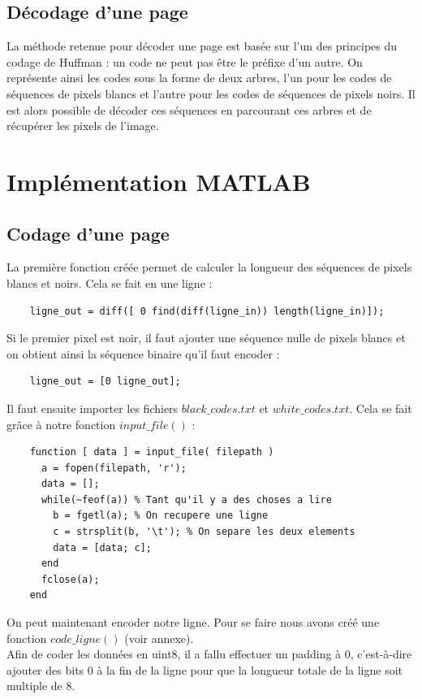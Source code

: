 \documentclass[11pt]{article}
\begin{document}
  \subsection{Décodage d'une page}
  
  La méthode retenue pour décoder une page est basée sur l'un des principes du codage de Huffman : un code ne peut pas être le préfixe d'un autre. On représente ainsi les codes sous la forme de deux arbres, l'un pour les codes de séquences de pixels blancs et l'autre pour les codes de séquences de pixels noirs. Il est alors possible de décoder ces séquences en parcourant ces arbres et de récupérer les pixels de l'image.

\section{Implémentation MATLAB}
  
  \subsection{Codage d'une page}
  
  La première fonction créée permet de calculer la longueur des séquences de pixels blancs et noirs. Cela se fait en une ligne :
  \begin{lstlisting}
  	ligne_out = diff([ 0 find(diff(ligne_in)) length(ligne_in)]);
  \end{lstlisting}

  Si le premier pixel est noir, il faut ajouter une séquence nulle de pixels blancs et on obtient ainsi la séquence binaire qu'il faut encoder :
  \begin{lstlisting}
  	ligne_out = [0 ligne_out];
  \end{lstlisting}
  
  Il faut ensuite importer les fichiers $black\_codes.txt$ et $white\_codes.txt$. Cela se fait grâce à notre fonction $input\_file()$ :
  \begin{lstlisting}
    function [ data ] = input_file( filepath )
      a = fopen(filepath, 'r');
      data = [];
      while(~feof(a)) % Tant qu'il y a des choses a lire
        b = fgetl(a); % On recupere une ligne
        c = strsplit(b, '\t'); % On separe les deux elements
        data = [data; c];
      end
      fclose(a);
    end
  \end{lstlisting}
  
  On peut maintenant encoder notre ligne. Pour se faire nous avons créé une fonction $code\_ligne()$ (voir annexe).\\
  Afin de coder les données en uint8, il a fallu effectuer un padding à $0$, c'est-à-dire ajouter des bits $0$ à la fin de la ligne pour que la longueur totale de la ligne soit multiple de 8.
  
\end{document}
